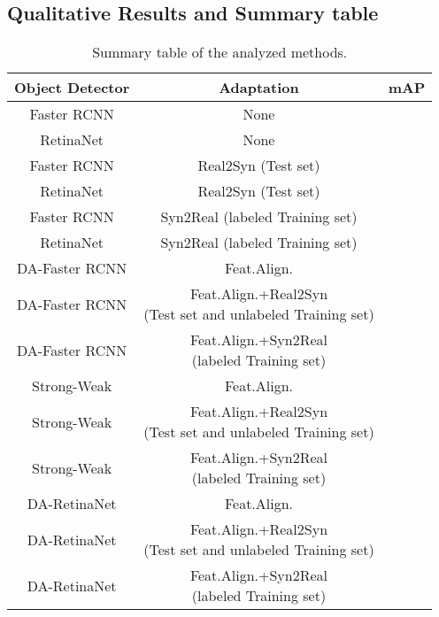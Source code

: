\documentclass[preprint]{elsarticle}
\begin{document}
\subsection{Qualitative Results and Summary table}
\begin{table}[t!]
\caption{Summary table of the analyzed methods.}
\label{tab:summary}
\centering
\begin{tabular}{|c||c||c|}
\hline
Object Detector & Adaptation & mAP\\
\hline
Faster RCNN & None &  \\
\hline
RetinaNet & None &  \\
\hline
Faster RCNN & Real2Syn (Test set) &  \\ 
\hline
RetinaNet & Real2Syn (Test set) &  \\
\hline
Faster RCNN & Syn2Real (labeled Training set) &  \\
\hline
RetinaNet & Syn2Real (labeled Training set) &  \\
\hline
DA-Faster RCNN & Feat.Align. &  \\
\hline
DA-Faster RCNN &
\shortstack{Feat.Align.+Real2Syn \\ (Test set and unlabeled Training set)}&  \\
\hline
DA-Faster RCNN &\shortstack{Feat.Align.+Syn2Real \\ (labeled Training set)} &  \\
\hline
Strong-Weak & Feat.Align. &  \\
\hline
Strong-Weak & \shortstack{Feat.Align.+Real2Syn \\ (Test set and unlabeled Training set)} &  \\
\hline
Strong-Weak & \shortstack{Feat.Align.+Syn2Real \\ (labeled Training set)} &  \\
\hline
DA-RetinaNet & Feat.Align. &  \\
\hline
DA-RetinaNet & \shortstack{Feat.Align.+Real2Syn \\ (Test set and unlabeled Training set)} &  \\
\hline
DA-RetinaNet & \shortstack{Feat.Align.+Syn2Real \\ (labeled Training set)} &  \\
\hline
\end{tabular}
\end{table}
\end{document}
